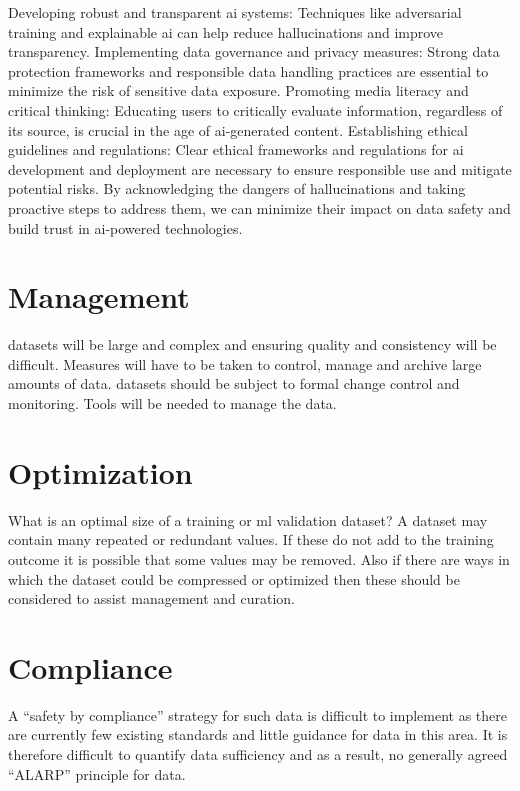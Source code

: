 \begin{aibox}
Developing robust and transparent \gls{ai} systems: Techniques like adversarial training and explainable \gls{ai} can help reduce hallucinations and improve transparency.
Implementing data governance and privacy measures: Strong data protection frameworks and responsible data handling practices are essential to minimize the risk of sensitive data exposure.
Promoting media literacy and critical thinking: Educating users to critically evaluate \gls{information}, regardless of its source, is crucial in the age of \gls{ai}-generated content.
Establishing ethical guidelines and regulations: Clear ethical frameworks and regulations for \gls{ai} development and deployment are necessary to ensure responsible use and mitigate potential risks.
By acknowledging the dangers of hallucinations and taking proactive steps to address them, we can minimize their impact on data safety and build trust in \gls{ai}-powered technologies.
\end{aibox}

\section{ Management}
\Glspl{dataset} will be large and complex and ensuring quality and \gls{consistency} will be difficult. Measures will have to be taken to control, manage and archive large amounts of data. \Glspl{dataset} should be subject to formal change control and monitoring. Tools will be needed to manage the data.

\section{Optimization}
What is an optimal size of a training or
\gls{ml}
validation \gls{dataset}? A \gls{dataset} may contain many repeated or redundant values. If these do not add to the training outcome it is possible that some values may be removed. Also if there are ways in which the \gls{dataset} could be compressed or optimized then these should be considered to assist management and curation.

\section{Compliance}
A ``safety by compliance'' strategy for such data is difficult to implement as there are currently
few existing standards and little guidance for data in this area.
It is therefore difficult to quantify data sufficiency and as a result, no generally agreed ``ALARP'' principle for data.

